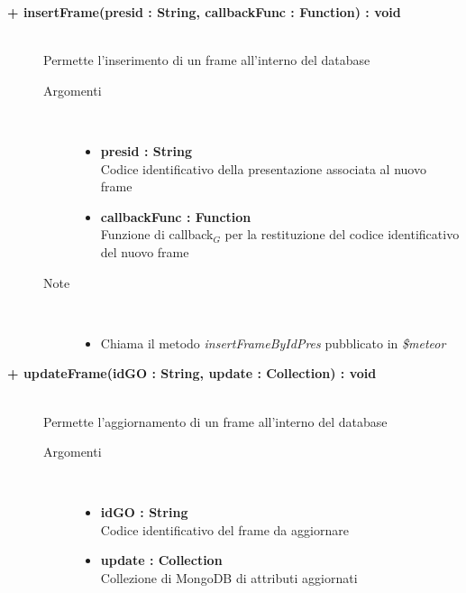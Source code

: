 \begin{description}
	\begin{description}
		\item[\textbf{\color{blue}+ insertFrame(presid : String, callbackFunc : Function) : void			}] \hfill \\
			Permette l'inserimento di un frame all'interno del database
			
		\begin{description}
			\item[Argomenti] \hfill \\
				\begin{itemize}
					\item \textbf{presid : String			} \hfill \\
					Codice identificativo della presentazione associata al nuovo frame
					\item \textbf{callbackFunc : Function			} \hfill \\
					Funzione di callback$_G$ per la restituzione del codice identificativo del nuovo frame
					
				\end{itemize}
			\item[Note] \hfill \\
			\begin{itemize}
					\item Chiama il metodo \textit{insertFrameByIdPres} pubblicato in \textit{\$meteor}
			\end{itemize}
		\end{description}
	\end{description}
	
	\begin{description}
		\item[\textbf{\color{blue}+ updateFrame(idGO : String, update : Collection) : void			}] \hfill \\
			Permette l'aggiornamento di un frame all'interno del database
			
		\begin{description}
			\item[Argomenti] \hfill \\
				\begin{itemize}
					\item \textbf{idGO : String			} \hfill \\
					Codice identificativo del frame da aggiornare
					\item \textbf{update : Collection			} \hfill \\
					Collezione di MongoDB di attributi aggiornati
					

\end{itemize}
\end{description}
\end{description}
\end{description}
